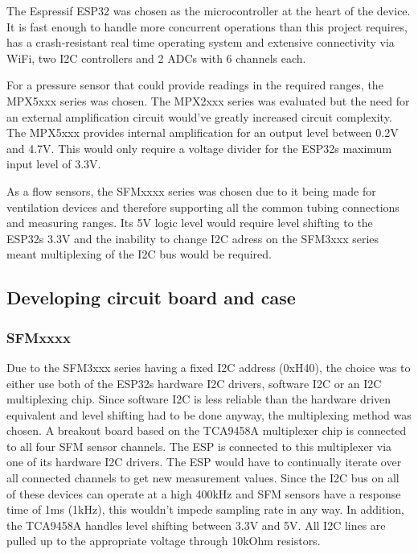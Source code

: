 \documentclass[MME,Projekt,english]{twbook}%
\begin{document}
The Espressif ESP32 was chosen as the microcontroller at the heart of the device. It is fast enough to handle more concurrent
operations than this project requires, has a crash-resistant real time operating system and extensive connectivity via WiFi, two I2C
controllers and 2 ADCs with 6 channels each.

For a pressure sensor that could provide readings in the required ranges, the MPX5xxx series was chosen. The MPX2xxx series was evaluated but
the need for an external amplification circuit would've greatly increased circuit complexity. The MPX5xxx provides internal amplification
for an output level between 0.2V and 4.7V. This would only require a voltage divider for the ESP32s maximum input level of 3.3V.

As a flow sensors, the SFMxxxx series was chosen due to it being made for ventilation devices and therefore supporting all the
common tubing connections and measuring ranges. Its 5V logic level would require level shifting to the ESP32s 3.3V and the inability
to change I2C adress on the SFM3xxx series meant multiplexing of the I2C bus would be required.

\subsection{Developing circuit board and case}

\subsubsection{SFMxxxx}

Due to the SFM3xxx series having a fixed I2C address (0xH40), the choice was to either use both of the ESP32s hardware I2C drivers,
software I2C or an I2C multiplexing chip. Since software I2C is less reliable than the hardware driven equivalent and level
shifting had to be done anyway, the multiplexing method was chosen. A breakout board based on the TCA9458A multiplexer chip
is connected to all four SFM sensor channels. The ESP is connected to this multiplexer via one of its hardware I2C drivers. The ESP
would have to continually iterate over all connected channels to get new measurement values. Since the I2C bus on all of these devices
can operate at a high 400kHz and SFM sensors have a response time of 1ms (1kHz), this wouldn't impede sampling rate in any way. In addition,
the TCA9458A handles level shifting between 3.3V and 5V. All I2C lines are pulled up to the appropriate voltage through 10kOhm resistors.
\end{document}
